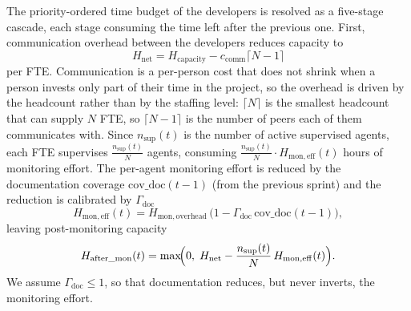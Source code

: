 \documentclass[smallextended]{svjour3}       %
\begin{document}
The priority-ordered time budget of the developers is
resolved as a five-stage cascade, each stage consuming the time left after the previous one. First, communication overhead between the developers reduces capacity to
\begin{equation}
  H_\mathrm{net} = H_\mathrm{capacity} - c_\mathrm{comm}\lceil N-1 \rceil
  \label{eq:hnet}
\end{equation}
per FTE. Communication is a per-person cost that does not shrink when a person invests only
part of their time in the project, so the overhead is driven by the headcount rather than by
the staffing level: $\lceil N \rceil$ is the smallest headcount that can supply $N$ FTE,
so $\lceil N-1 \rceil$ is the number of peers each of them communicates with. Since $n_\mathrm{sup}(t)$ is the number of active supervised agents, each FTE supervises
$\frac{n_\mathrm{sup}(t)}{N}$ agents, consuming $\frac{n_\mathrm{sup}(t)}{N} \cdot H_\mathrm{mon,eff}(t)$ hours of monitoring effort. The per-agent monitoring effort is reduced by the documentation coverage $\mathrm{cov\_doc}(t-1)$ (from the previous sprint) and the reduction is calibrated by $\Gamma_\mathrm{doc}$
\begin{equation}
  H_\mathrm{mon,eff}(t) = H_\mathrm{mon,overhead}\,
    \bigl(1 - \Gamma_\mathrm{doc}\,\mathrm{cov\_doc}(t-1)\bigr),
  \label{eq:hmoneff}
\end{equation}
leaving post-monitoring capacity
\begin{equation}
  H_\mathrm{after\_mon}(t) = \max\!\Bigl(0,\; H_\mathrm{net} -
    \frac{n_\mathrm{sup}(t)}{N}\,H_\mathrm{mon,eff}(t)\Bigr).
  \label{eq:hafter_mon}
\end{equation}
We assume $\Gamma_\mathrm{doc} \leq 1$, so that documentation reduces, but never inverts, the monitoring effort.
\end{document}
